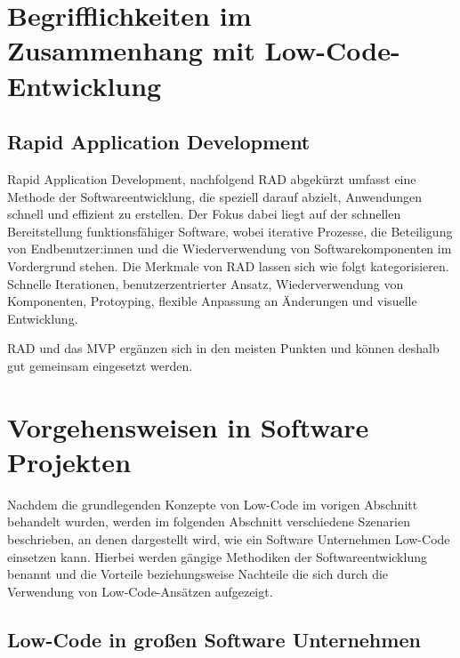 \documentclass[acmtog, language=ngerman]{acmart}
\begin{document}
\section{Begrifflichkeiten im Zusammenhang mit Low-Code-Entwicklung}



\subsection{Rapid Application Development} \label{sec:rad}

Rapid Application Development, nachfolgend RAD abgekürzt umfasst eine Methode der Softwareentwicklung, die speziell darauf abzielt, Anwendungen schnell und effizient zu erstellen. Der Fokus dabei liegt auf der schnellen Bereitstellung funktionsfähiger Software, wobei iterative Prozesse, die Beteiligung von Endbenutzer:innen und die Wiederverwendung von Softwarekomponenten im Vordergrund stehen.
Die Merkmale von RAD lassen sich wie folgt kategorisieren. Schnelle Iterationen, benutzerzentrierter Ansatz, Wiederverwendung von Komponenten, Protoyping, flexible Anpassung an Änderungen und visuelle Entwicklung. \cite{rapid_protoyping}

RAD und das MVP ergänzen sich in den meisten Punkten und können deshalb gut gemeinsam eingesetzt werden.



\section{Vorgehensweisen in Software Projekten}

Nachdem die grundlegenden Konzepte von Low-Code im vorigen Abschnitt behandelt wurden, werden im folgenden Abschnitt verschiedene Szenarien beschrieben, an denen dargestellt wird, wie ein Software Unternehmen Low-Code einsetzen kann. Hierbei werden gängige Methodiken der Softwareentwicklung benannt und die Vorteile beziehungsweise Nachteile die sich durch die Verwendung von Low-Code-Ansätzen aufgezeigt.

\subsection{Low-Code in großen Software Unternehmen }
\end{document}
